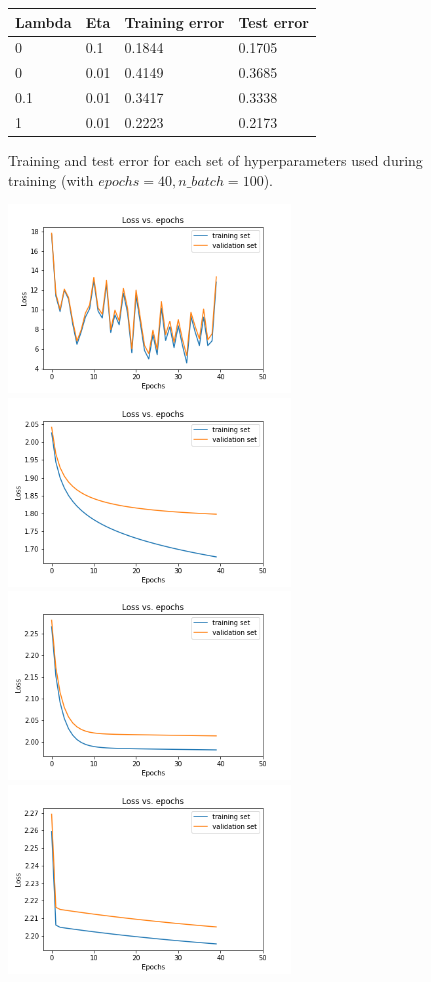 \documentclass[10pt,a4paper]{article}
\begin{document}
\begin{figure}[H]
\centering
\begin{tabular}{|llll|}
\hline
Lambda & Eta & Training error & Test error \\
\hline
0 &  0.1 & 0.1844 & 0.1705\\ 
0 & 0.01 & 0.4149 & 0.3685\\
0.1 & 0.01 & 0.3417 & 0.3338\\
1 & 0.01 & 0.2223 & 0.2173 \\
\hline
\end{tabular}
\caption{Training and test error for each set of hyperparameters used during training (with $epochs=40,n\_batch=100$).}
\label{results}
\end{figure}

\begin{figure}[H]
\includegraphics[width=7.5cm]{img/training1.png}
\includegraphics[width=7.5cm]{img/training2.png}\\
\includegraphics[width=7.5cm]{img/training3.png}
\includegraphics[width=7.5cm]{img/training4.png}

\end{figure}
\end{document}
